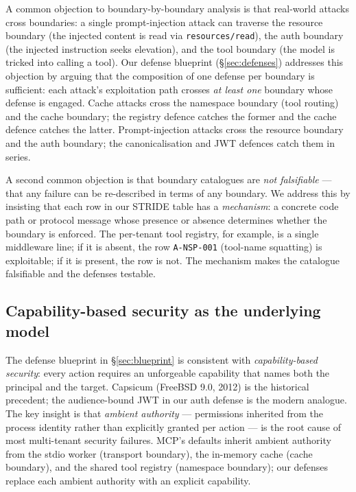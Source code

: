 A common objection to boundary-by-boundary analysis is that
real-world attacks cross boundaries: a single prompt-injection
attack can traverse the resource boundary (the injected content
is read via \texttt{resources/read}), the auth boundary (the
injected instruction seeks elevation), and the tool boundary
(the model is tricked into calling a tool). Our defense
blueprint (\S\ref{sec:defenses}) addresses this objection by
arguing that the composition of one defense per boundary is
sufficient: each attack's exploitation path crosses
\emph{at least one} boundary whose defense is engaged. Cache
attacks cross the namespace boundary (tool routing) and the
cache boundary; the registry defence catches the former and
the cache defence catches the latter. Prompt-injection attacks
cross the resource boundary and the auth boundary; the
canonicalisation and JWT defences catch them in series.

A second common objection is that boundary catalogues are
\emph{not falsifiable} --- that any failure can be re-described
in terms of any boundary. We address this by insisting that
each row in our STRIDE table has a \emph{mechanism}: a
concrete code path or protocol message whose presence or
absence determines whether the boundary is enforced. The
per-tenant tool registry, for example, is a single middleware
line; if it is absent, the row \texttt{A-NSP-001} (tool-name
squatting) is exploitable; if it is present, the row is not.
The mechanism makes the catalogue falsifiable and the defenses
testable.

\subsection{Capability-based security as the underlying model}

The defense blueprint in \S\ref{sec:blueprint} is consistent with
\emph{capability-based security}: every action requires an
unforgeable capability that names both the principal and the
target. Capsicum (FreeBSD 9.0, 2012) is the historical
precedent; the audience-bound JWT in our auth defense is the
modern analogue. The key insight is that \emph{ambient authority}
--- permissions inherited from the process identity rather than
explicitly granted per action --- is the root cause of most
multi-tenant security failures. MCP's defaults inherit ambient
authority from the stdio worker (transport boundary), the
in-memory cache (cache boundary), and the shared tool registry
(namespace boundary); our defenses replace each ambient
authority with an explicit capability.

